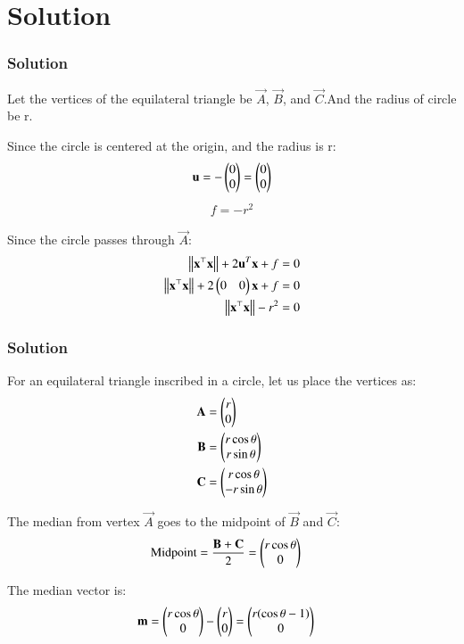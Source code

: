 \documentclass{beamer}
\numberwithin{equation}{section}
\begin{document}
\section{Solution}
\begin{frame}[fragile]
    \frametitle{Solution}
Let the vertices of the equilateral triangle be $\vec{A}$, $\vec{B}$, and $\vec{C}$.And the radius of circle be r.

Since the circle is centered at the origin, and the radius is r:
\begin{align}
\mathbf{u} = -\begin{pmatrix}0 \\ 0\end{pmatrix} = \begin{pmatrix}0 \\ 0\end{pmatrix}
\end{align}
\begin{align}
f=-r^2
\end{align}

Since the circle passes through $\vec{A}$:
\begin{align}
\left\lVert\mathbf{x}^\top\mathbf{x}\right\rVert + 2\mathbf{u}^T\mathbf{x} + f &= 0\\
\left\lVert\mathbf{x}^\top\mathbf{x}\right\rVert+ 2\begin{pmatrix}0 & 0\end{pmatrix}\mathbf{x} + f &= 0\\
\left\lVert\mathbf{x}^\top\mathbf{x}\right\rVert - r^2 &= 0\\
\end{align}

\end{frame}
\begin{frame}[fragile]
    \frametitle{Solution}
For an equilateral triangle inscribed in a circle, let us place the vertices as:
\begin{align}
\mathbf{A} &= \begin{pmatrix}r \\ 0\end{pmatrix}\\
\mathbf{B} &= \begin{pmatrix}r\cos\theta \\ r\sin\theta\end{pmatrix}\\
\mathbf{C} &= \begin{pmatrix}r\cos\theta \\ -r\sin\theta\end{pmatrix}
\end{align}

The median from vertex $\vec{A}$ goes to the midpoint of $\vec{B}$ and $\vec{C}$:
\begin{align}
\text{Midpoint} &= \frac{\mathbf{B} + \mathbf{C}}{2} = \begin{pmatrix}r\cos\theta \\ 0\end{pmatrix}
\end{align}

The median vector is:
\begin{align}
\mathbf{m} &= \begin{pmatrix}r\cos\theta \\ 0\end{pmatrix} - \begin{pmatrix}r \\ 0\end{pmatrix} = \begin{pmatrix}r(\cos\theta - 1) \\ 0\end{pmatrix}
\end{align}

\end{frame}
\end{document}
